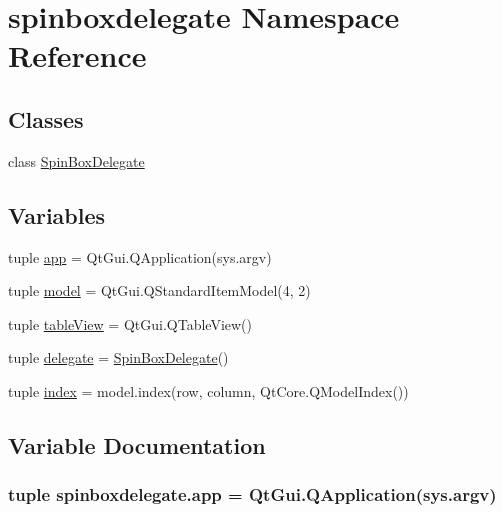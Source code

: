 \hypertarget{namespacespinboxdelegate}{}\section{spinboxdelegate Namespace Reference}
\label{namespacespinboxdelegate}
\subsection*{Classes}
\begin{DoxyCompactItemize}
\item 
class \hyperlink{classspinboxdelegate_1_1SpinBoxDelegate}{Spin\+Box\+Delegate}
\end{DoxyCompactItemize}
\subsection*{Variables}
\begin{DoxyCompactItemize}
\item 
tuple \hyperlink{namespacespinboxdelegate_a4f49c015ed5a36d52e377f9c20ccd783}{app} = Qt\+Gui.\+Q\+Application(sys.\+argv)
\item 
tuple \hyperlink{namespacespinboxdelegate_a3cf773215c38e01b0ef4f7d8502ee7f8}{model} = Qt\+Gui.\+Q\+Standard\+Item\+Model(4, 2)
\item 
tuple \hyperlink{namespacespinboxdelegate_a46d20b9f23aca9d182a616b92ec370e0}{table\+View} = Qt\+Gui.\+Q\+Table\+View()
\item 
tuple \hyperlink{namespacespinboxdelegate_affde55843ab83bd8f4f72a54939f4d1b}{delegate} = \hyperlink{classspinboxdelegate_1_1SpinBoxDelegate}{Spin\+Box\+Delegate}()
\item 
tuple \hyperlink{namespacespinboxdelegate_ad25af901d52d3bd30deae4afa444a3b6}{index} = model.\+index(row, column, Qt\+Core.\+Q\+Model\+Index())
\end{DoxyCompactItemize}


\subsection{Variable Documentation}
\hypertarget{namespacespinboxdelegate_a4f49c015ed5a36d52e377f9c20ccd783}{}
\subsubsection[{app}]{\setlength{\rightskip}{0pt plus 5cm}tuple spinboxdelegate.\+app = Qt\+Gui.\+Q\+Application(sys.\+argv)}\label{namespacespinboxdelegate_a4f49c015ed5a36d52e377f9c20ccd783}
\hypertarget{namespacespinboxdelegate_affde55843ab83bd8f4f72a54939f4d1b}{}
